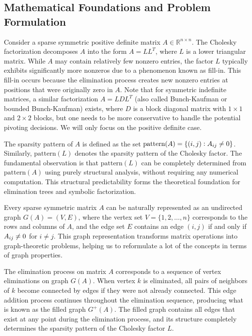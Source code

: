 \subsection{Mathematical Foundations and Problem Formulation}

Consider a sparse symmetric positive definite matrix $A \in \mathbb{R}^{n \times n}$. The Cholesky factorization decomposes $A$ into the form $A = LL^T$, where $L$ is a lower triangular matrix. While $A$ may contain relatively few nonzero entries, the factor $L$ typically exhibits significantly more nonzeros due to a phenomenon known as fill-in. This fill-in occurs because the elimination process creates new nonzero entries at positions that were originally zero in $A$. Note that for symmetric indefinite matrices, a similar factorization $A = LDL^T$ (also called Bunch-Kaufman or bounded Bunch-Kaufman) exists, where $D$ is a block diagonal matrix with $1 \times 1$ and $2 \times 2$ blocks, but one needs to be more conservative to handle the potential pivoting decisions. We will only focus on the positive definite case.

The sparsity pattern of $A$ is defined as the set $\text{pattern}(A) = \{(i,j) : A\sb{ij} \neq 0\}$. Similarly, $\text{pattern}(L)$ denotes the sparsity pattern of the Cholesky factor. The fundamental observation is that $\text{pattern}(L)$ can be completely determined from $\text{pattern}(A)$ using purely structural analysis, without requiring any numerical computation. This structural predictability forms the theoretical foundation for elimination trees and symbolic factorization.

Every sparse symmetric matrix $A$ can be naturally represented as an undirected graph $G(A) = (V, E)$, where the vertex set $V = \{1, 2, \ldots, n\}$ corresponds to the rows and columns of $A$, and the edge set $E$ contains an edge $(i,j)$ if and only if $A\sb{ij} \neq 0$ for $i \neq j$. This graph representation transforms matrix operations into graph-theoretic problems, helping us to reformulate a lot of the concepts in terms of graph properties.

The elimination process on matrix $A$ corresponds to a sequence of vertex eliminations on graph $G(A)$. When vertex $k$ is eliminated, all pairs of neighbors of $k$ become connected by edges if they were not already connected. This edge addition process continues throughout the elimination sequence, producing what is known as the filled graph $G^+(A)$. The filled graph contains all edges that exist at any point during the elimination process, and its structure completely determines the sparsity pattern of the Cholesky factor $L$.

